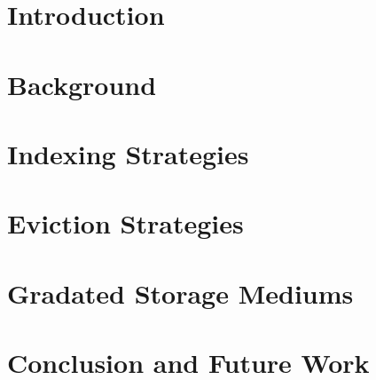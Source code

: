 \chapter{Introduction}
\label{chap:Introduction}


\chapter{Background}
\label{chap:Background}


\chapter{Indexing Strategies}
\label{chap:Indexing_Strategies}


\chapter{Eviction Strategies}
\label{chap:Eviction_Strategies}


\chapter{Gradated Storage Mediums}
\label{chap:Storage_Mediums}


\chapter{Conclusion and Future Work}
\label{chap:Conclusion}

